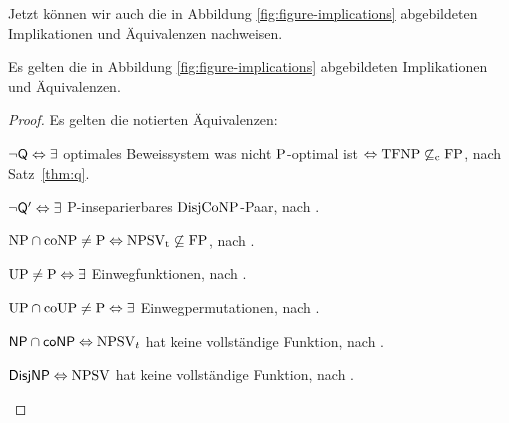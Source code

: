 Jetzt können wir auch die in Abbildung \ref{fig:figure-implications} abgebildeten Implikationen und Äquivalenzen nachweisen.
\begin{theorem}\label{thm:figure-implications}
    Es gelten die in Abbildung \ref{fig:figure-implications} abgebildeten Implikationen und Äquivalenzen.
\end{theorem}
\begin{proof}
    Es gelten die notierten Äquivalenzen:
    \begin{Prooflist}[nosep,midpenalty=0,label={\arabic*.},labelsep=3pt]
    \item $\neg\hQ \Leftrightarrow \exists$ optimales Beweissystem was nicht $\P$-optimal ist $\Leftrightarrow \TFNP\not\subseteq_\mathrm{c} \FP$, nach Satz~\ref{thm:q}.
    \item $\neg\hQ' \Leftrightarrow\exists$ P-inseparierbares $\DisjCoNP$-Paar, nach \textcite[Lemma~2.12, vgl. Appendix]{fortnow_separability_1993}.
    \item $\NP\cap\coNP\neq\P \Leftrightarrow \NPSVt\not\subseteq\FP$, nach \textcite[Prop.~1]{fenner_inverting_2003}.
    \item $\UP\neq\P \Leftrightarrow\exists$ Einwegfunktionen, nach \textcite[Thm.~10]{grollmann_complexity_1988}.
    \item $\UP\cap\coUP\neq\P \Leftrightarrow\exists$ Einwegpermutationen, nach \textcite{homan_one-way_2003}.
    \item $\hNPcoNP \Leftrightarrow \NPSV_t$ hat keine vollständige Funktion, nach \textcite[Prop.~3]{beyersdorff_nondeterministic_2009}.
    \item $\hDisjNP \Leftrightarrow \NPSV$ hat keine vollständige Funktion, nach \textcite[Thm.~9]{glaser_reductions_2005}.
    \end{Prooflist}


\end{proof}
